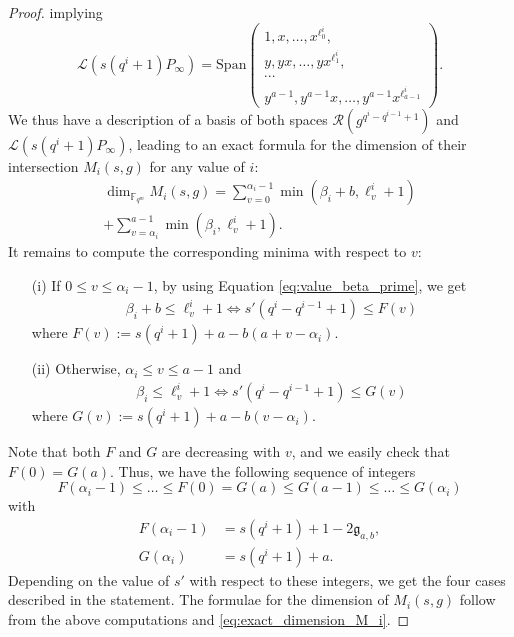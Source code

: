 \documentclass[journal]{IEEEtran}
\theoremstyle{plain}
\theoremstyle{definition}
\theoremstyle{remark}
\newcommand{\calL}{\mathcal{L}}
\newcommand{\calR}{\mathcal{R}}
\newcommand{\fqm}{\mathbb{F}_{q^m}}
\begin{document}
\begin{proof}
		implying
		\begin{equation*}
			\calL(s(q^i+1)P_\infty) = \mathrm{Span}    \left( \begin{array}{c}
				1,x,\dots,x^{\ell^i_0},   \\
				y,yx,\dots,yx^{\ell^i_1}, \\
				\cdots \\
				y^{a-1},y^{a-1}x,\dots,y^{a-1}x^{\ell^i_{a-1}}
			\end{array}
			\right).
		\end{equation*}
		We thus have a description of a basis of both spaces $\calR(g^{q^i-q^{i-1}+1})$ and $\calL(s(q^i+1)P_\infty)$, leading to an exact formula for the dimension of their intersection $M_i(s,g)$ for any value of $i$:
		\begin{multline} \label{eq:exact_dimension_M_i}
			\dim_{\fqm} M_i(s,g) = \sum\limits_{v=0}^{\alpha_i-1} \min(\beta_i+b,\ell_v^i+1) \\ + \sum\limits_{v=\alpha_i}^{a-1} \min(\beta_i,\ell_v^i+1).
		\end{multline}
		It remains to compute the corresponding minima with respect to $v$:
		\begin{itemize}
			\item[(i)] If $0 \leq v \leq \alpha_i-1$, by using Equation \eqref{eq:value_beta_prime}, we get
			\begin{align*}
				\beta_i+b \leq \ell_v^i +1 \iff s'(q^i-q^{i-1}+1) \leq F(v)
			\end{align*}
		where $F(v) := s(q^i+1)+a-b(a+v-\alpha_i)$.
			\item[(ii)] Otherwise, $\alpha_i \leq v \leq a-1$ and
			\begin{align*}
				\beta_i \leq \ell_v^i +1 \iff s'(q^i-q^{i-1}+1) \leq G(v)
			\end{align*}
		where $G(v) := s(q^i+1)+a-b(v-\alpha_i)$.
		\end{itemize}
		Note that both $F$ and $G$ are decreasing with $v$, and we easily check that $F(0) = G(a)$. Thus, we have the following sequence of integers
		$$F(\alpha_i-1) \leq \dots \leq F(0) = G(a) \leq G(a-1) \leq \dots \leq G(\alpha_i)$$
		with 
		\begin{align*}
			F(\alpha_i-1)&=s(q^i+1)+1-2\mathfrak{g}_{a,b},\\
			G(\alpha_i)&= s(q^i+1)+a.
		\end{align*}
		Depending on the value of $s'$ with respect to these integers, we get the four cases described in the statement. The formulae for the dimension of $M_i(s,g)$ follow from the above computations and \eqref{eq:exact_dimension_M_i}.

\end{proof}
\end{document}
